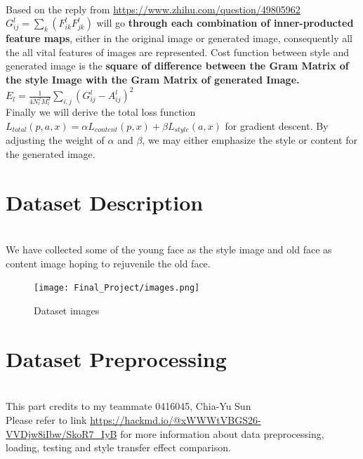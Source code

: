 \documentclass[11pt, a4paper]{article} %
\begin{document}
\\ Based on the reply from \url{https://www.zhihu.com/question/49805962}
\\ $G^{l}_{ij} = \sum_{k}(F^{l}_{ik}F^l_{jk})$ will go \textbf{through each combination of inner-producted feature maps}, either in the original image or generated image, consequently all the all vital features of images are represented. Cost function between style and generated image is the \textbf{square of difference between the Gram Matrix of the style Image with the Gram Matrix of generated Image.} $E_{l} = \frac{1}{4N^{2}_{l}M^2_{l}} \sum_{i, j}(G^{l}_{ij} - A^l_{ij})^2$
\\ Finally we will derive the total loss function $L_{total}(p, a, x) = \alpha L_{content}(p, x) + \beta L_{style}(a, x)$ for gradient descent. By adjusting the weight of $\alpha$ and $\beta$, we may either emphasize the style or content for the generated image.

\section{Dataset Description}
\\ We have collected some of the young face as the style image and old face as content image hoping to rejuvenile the old face.
\begin{figure}[H]
    \centering
    \texttt{[image: Final\_Project/images.png]}
    \caption{Dataset images}
    \label{fig:my_label}
\end{figure}
\section{Dataset Preprocessing}
\\ This part credits to my teammate 0416045, Chia-Yu Sun
\\ Please refer to link \url{https://hackmd.io/@xWWWtVBGS26-VVDjw8iIbw/SkoR7_IyB} for more information about data preprocessing, loading, testing and style transfer effect comparison.
\end{document}
